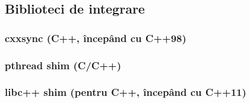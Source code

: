 \subsection{Biblioteci de integrare}
\label{integration-libraries}

\subsubsection{cxxsync (C++, începând cu C++98)}

\subsubsection{pthread shim (C/C++)}

\subsubsection{libc++ shim (pentru C++, începând cu C++11)}
